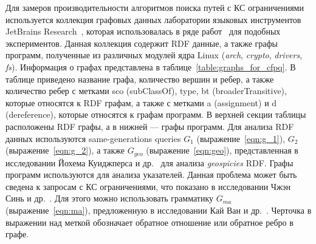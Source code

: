 Для замеров производительности алгоритмов поиска путей с КС ограничениями используется коллекция графовых данных лаборатории языковых инструментов JetBrains Research~\cite{net:cfpq_data}, которая использовалась в ряде работ~\cite{inproceedings:matrix_cfpq, inproceedings:cfpq_matrix_evaluation, inbook:kronecker_cfpq_adbis, inproceedings:cfqp_matrix_with_single_source} для подобных экспериментов. 
Данная коллекция содержит RDF данные, а также графы программ, полученные из различных модулей ядра Linux (\textit{arch}, \textit{crypto}, \textit{drivers}, \textit{fs}). 
Информация о графах представлена в таблице~\ref{table:graphs_for_cfpq}. 
В таблице приведено название графа, количество вершин и ребер, а также количество ребер с метками sco (subClassOf), type, bt (broaderTransitive), которые относятся к RDF графам, а также с метками a (assignment) и d (dereference), которые относятся к графам программ. В верхней секции таблицы расположены RDF графы, а в нижней --- графы программ. 
Для анализа RDF данных используются same-generations queries $G_1$ (выражение~\ref{eqn:g_1}), $G_2$ (выражение~\ref{eqn:g_2}), а также $G_{geo}$ (выражение~\ref{eqn:geo}), представленная в исследовании Йохема Куиджперса и др.~\cite{article:kuijpers_cfpq_exp_compare} для анализа \textit{geospicies} RDF. 
Графы программ используются для анализа указателей. 
Данная проблема может быть сведена к запросам с КС ограничениями, что показано в исследовании Чжэн Синь и др.~\cite{Zheng:2008:DAA:1328897.1328464}. Для этого можно использовать грамматику $G_{ma}$ (выражение~\ref{eqn:ma}), предложенную в исследовании Кай Ван и др.~\cite{10.1145/3093336.3037744}. Черточка в выражении над меткой обозначает обратное отношение или обратное ребро в графе. 

